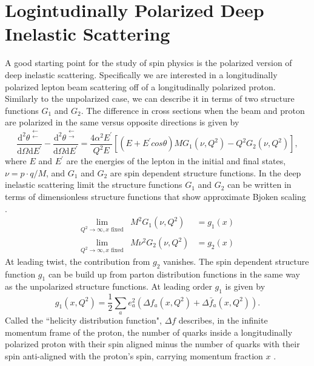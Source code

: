 \documentclass[letterpaper, abstract = on,listof=totoc, bibliography=totoc]{scrreprt}
\begin{document}
\section{Logintudinally Polarized Deep Inelastic Scattering}
A good starting point for the study of spin physics is the polarized version of deep inelastic scattering. Specifically we are interested in a longitudinally polarized lepton beam scattering off of a longitudinally polarized proton. Similarly to the unpolarized case, we can describe it in terms of two structure functions $G_1$ and $G_2$. The difference in cross sections when the beam and proton are polarized in the same versus opposite directions is given by
\begin{equation}
\frac{\text{d}^2 \theta^{\substack{\leftarrow \\ \leftarrow}}}{\text{d} \Omega \text{d}E^{'}} - \frac{\text{d}^2\theta^{\substack{\leftarrow \\ \rightarrow}}}{\text{d}\Omega\text{d}E^{'}} = \frac{4\alpha^2E^{'}}{Q^2E}\left[(E+E^{'}cos\theta)MG_1(\nu,Q^2) - Q^2G_2(\nu,Q^2)\right],
\end{equation}
where $E$ and $E^{'}$ are the energies of the lepton in the initial and final states, $\nu = p\cdot q/M$, and $G_1$ and $G_2$ are spin dependent structure functions. In the deep inelastic scattering limit the structure functions $G_1$ and $G_2$ can be written in terms of  dimensionless structure functions that show approximate Bjoken scaling \cite{longReviewPaper}. 
\begin{eqnarray}
\lim\limits_{Q^2\rightarrow\infty, x \text{ fixed}}& M^2G_1(\nu,Q^2) &= g_1(x) \label{eq:g1}\\
\lim\limits_{Q^2\rightarrow\infty, x \text{ fixed}}& M\nu^2G_2(\nu,Q^2) &= g_2(x) \label{eq:g2}
\end{eqnarray}
At leading twist, the contribution from $g_2$ vanishes. The spin dependent structure function $g_1$ can be build up from parton distribution functions in the same way as the unpolarized structure functions. At leading order $g_1$ is given by
\begin{equation}
g_1(x,Q^2) = \frac{1}{2} \sum\limits_a e^2_a\left(\Delta f_a(x,Q^2) + \Delta \bar{f}_a(x,Q^2)\right).
\end{equation}
Called the ``helicity distribution function", $\Delta f$ describes, in the infinite momentum frame of the proton, the number of quarks inside a longitudinally polarized proton with their spin aligned minus the number of quarks with their spin anti-aligned with the proton's spin, carrying momentum fraction $x$ \cite{longReviewPaper}.
\end{document}
